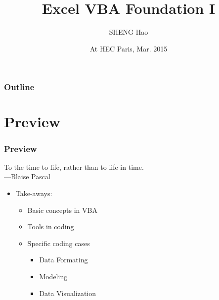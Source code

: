 \documentclass[13pt]{beamer}
\title[To JY.Z. \& JY.Y.] %
{Excel VBA Foundation I}
\author[SHENG Hao] %
{SHENG Hao\inst{1}}
\institute[GSM, PKU] %
{
  \inst{1}%
  Guanghua School of Management,\\
  Peking University
}
\date[\today] %
{ At HEC Paris, Mar. 2015}
\begin{document}
\DeclarePairedDelimiter{\ceil}{\lceil}{\rceil}


\begin{frame}
  \titlepage
\end{frame}

\addtocounter{framenumber}{-1}
\begin{frame}
  \frametitle{Outline}
  \tableofcontents
\end{frame}



\section{Preview}

\begin{frame}[t]
  \frametitle{Preview}
  \begin{flushright}
    {\sc To the time to life, rather than to life in time.\\}%
  	{\sc---Blaise Pascal}
  \end{flushright}

  \vspace{30pt}

  \begin{itemize}
  \item Take-aways:
  \begin{itemize}
  		\item Basic concepts in VBA \pause
      \item Tools in coding \pause
      \item Specific coding cases \pause
      \begin{itemize}
        \item Data Formating \pause
        \item Modeling \pause
        \item Data Visualization 
      \end{itemize}
 \end{itemize}
  \end{itemize}
  \vspace{80pt}
\end{frame}
\end{document}
